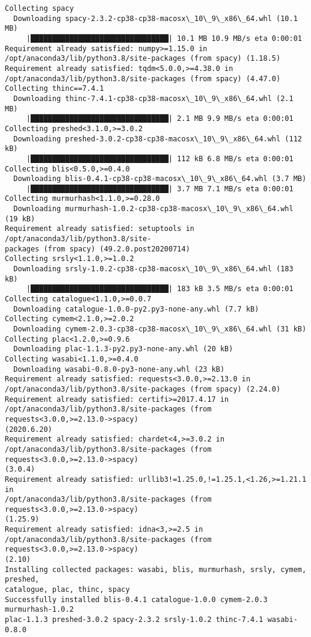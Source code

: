 \documentclass[11pt]{article}
\begin{document}
    \begin{Verbatim}[commandchars=\\\{\}]
Collecting spacy
  Downloading spacy-2.3.2-cp38-cp38-macosx\_10\_9\_x86\_64.whl (10.1 MB)
     |████████████████████████████████| 10.1 MB 10.9 MB/s eta 0:00:01
Requirement already satisfied: numpy>=1.15.0 in
/opt/anaconda3/lib/python3.8/site-packages (from spacy) (1.18.5)
Requirement already satisfied: tqdm<5.0.0,>=4.38.0 in
/opt/anaconda3/lib/python3.8/site-packages (from spacy) (4.47.0)
Collecting thinc==7.4.1
  Downloading thinc-7.4.1-cp38-cp38-macosx\_10\_9\_x86\_64.whl (2.1 MB)
     |████████████████████████████████| 2.1 MB 9.9 MB/s eta 0:00:01
Collecting preshed<3.1.0,>=3.0.2
  Downloading preshed-3.0.2-cp38-cp38-macosx\_10\_9\_x86\_64.whl (112 kB)
     |████████████████████████████████| 112 kB 6.8 MB/s eta 0:00:01
Collecting blis<0.5.0,>=0.4.0
  Downloading blis-0.4.1-cp38-cp38-macosx\_10\_9\_x86\_64.whl (3.7 MB)
     |████████████████████████████████| 3.7 MB 7.1 MB/s eta 0:00:01
Collecting murmurhash<1.1.0,>=0.28.0
  Downloading murmurhash-1.0.2-cp38-cp38-macosx\_10\_9\_x86\_64.whl (19 kB)
Requirement already satisfied: setuptools in /opt/anaconda3/lib/python3.8/site-
packages (from spacy) (49.2.0.post20200714)
Collecting srsly<1.1.0,>=1.0.2
  Downloading srsly-1.0.2-cp38-cp38-macosx\_10\_9\_x86\_64.whl (183 kB)
     |████████████████████████████████| 183 kB 3.5 MB/s eta 0:00:01
Collecting catalogue<1.1.0,>=0.0.7
  Downloading catalogue-1.0.0-py2.py3-none-any.whl (7.7 kB)
Collecting cymem<2.1.0,>=2.0.2
  Downloading cymem-2.0.3-cp38-cp38-macosx\_10\_9\_x86\_64.whl (31 kB)
Collecting plac<1.2.0,>=0.9.6
  Downloading plac-1.1.3-py2.py3-none-any.whl (20 kB)
Collecting wasabi<1.1.0,>=0.4.0
  Downloading wasabi-0.8.0-py3-none-any.whl (23 kB)
Requirement already satisfied: requests<3.0.0,>=2.13.0 in
/opt/anaconda3/lib/python3.8/site-packages (from spacy) (2.24.0)
Requirement already satisfied: certifi>=2017.4.17 in
/opt/anaconda3/lib/python3.8/site-packages (from requests<3.0.0,>=2.13.0->spacy)
(2020.6.20)
Requirement already satisfied: chardet<4,>=3.0.2 in
/opt/anaconda3/lib/python3.8/site-packages (from requests<3.0.0,>=2.13.0->spacy)
(3.0.4)
Requirement already satisfied: urllib3!=1.25.0,!=1.25.1,<1.26,>=1.21.1 in
/opt/anaconda3/lib/python3.8/site-packages (from requests<3.0.0,>=2.13.0->spacy)
(1.25.9)
Requirement already satisfied: idna<3,>=2.5 in
/opt/anaconda3/lib/python3.8/site-packages (from requests<3.0.0,>=2.13.0->spacy)
(2.10)
Installing collected packages: wasabi, blis, murmurhash, srsly, cymem, preshed,
catalogue, plac, thinc, spacy
Successfully installed blis-0.4.1 catalogue-1.0.0 cymem-2.0.3 murmurhash-1.0.2
plac-1.1.3 preshed-3.0.2 spacy-2.3.2 srsly-1.0.2 thinc-7.4.1 wasabi-0.8.0
    \end{Verbatim}
\end{document}
